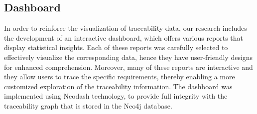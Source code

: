 








\subsection{Dashboard}
\label{sec:dboard}


In order to reinforce the visualization of traceability data, our research includes the development of an interactive dashboard, which offers various reports that display statistical insights. Each of these reports was carefully selected to effectively visualize the corresponding data, hence they have user-friendly designs for enhanced comprehension. Moreover, many of these reports are interactive and they allow users to trace the specific requirements, thereby enabling a more customized exploration of the traceability information.
The dashboard was implemented using Neodash technology, to provide full integrity with the traceability graph that is stored in the Neo4j database.

